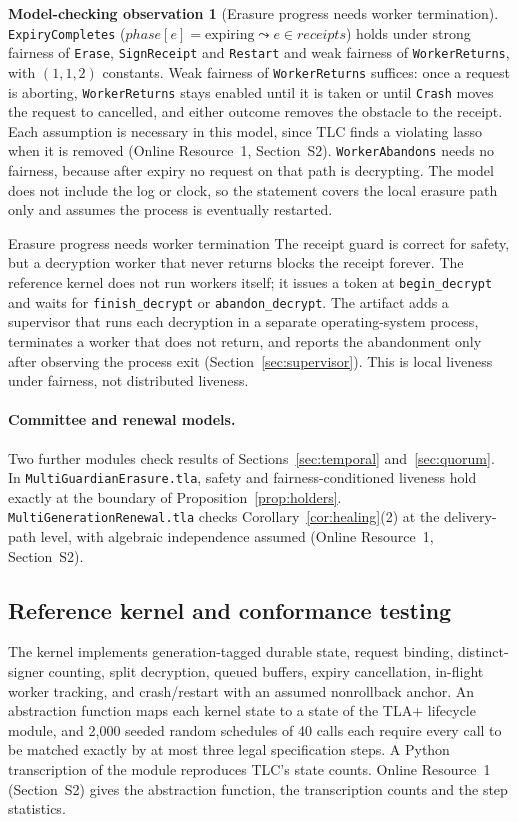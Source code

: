 \documentclass[pdflatex,sn-mathphys-num]{sn-jnl}%
\theoremstyle{plain}
\theoremstyle{definition}
\newtheorem{observation}{Model-checking observation}
\newcommand{\code}[1]{\texttt{#1}}
\begin{document}
\begin{observation}[Erasure progress needs worker termination]\label{obs:liveness}
\code{ExpiryCompletes} ($\mathit{phase}[e]=\text{expiring}\leadsto e\in\mathit{receipts}$) holds under strong fairness of \code{Erase}, \code{SignReceipt} and \code{Restart} and weak fairness of \code{WorkerReturns}, with $(1,1,2)$ constants. Weak fairness of \code{WorkerReturns} suffices: once a request is aborting, \code{WorkerReturns} stays enabled until it is taken or until \code{Crash} moves the request to cancelled, and either outcome removes the obstacle to the receipt. Each assumption is necessary in this model, since TLC finds a violating lasso when it is removed (Online Resource~1, Section~S2). \code{WorkerAbandons} needs no fairness, because after expiry no request on that path is decrypting. The model does not include the log or clock, so the statement covers the local erasure path only and assumes the process is eventually restarted.
\end{observation}

\begin{warnbox}{Erasure progress needs worker termination}
The receipt guard is correct for safety, but a decryption worker that never returns blocks the receipt forever. The reference kernel does not run workers itself; it issues a token at \code{begin\_decrypt} and waits for \code{finish\_decrypt} or \code{abandon\_decrypt}. The artifact adds a supervisor that runs each decryption in a separate operating-system process, terminates a worker that does not return, and reports the abandonment only after observing the process exit (Section~\ref{sec:supervisor}). This is local liveness under fairness, not distributed liveness.
\end{warnbox}

\paragraph{Committee and renewal models.}
Two further modules check results of Sections~\ref{sec:temporal} and~\ref{sec:quorum}. In \code{MultiGuardianErasure.tla}, safety and fairness-conditioned liveness hold exactly at the boundary of Proposition~\ref{prop:holders}. \code{MultiGenerationRenewal.tla} checks Corollary~\ref{cor:healing}(2) at the delivery-path level, with algebraic independence assumed (Online Resource~1, Section~S2).

\subsection{Reference kernel and conformance testing}
The kernel implements generation-tagged durable state, request binding, distinct-signer counting, split decryption, queued buffers, expiry cancellation, in-flight worker tracking, and crash/restart with an assumed nonrollback anchor. An abstraction function maps each kernel state to a state of the TLA+ lifecycle module, and 2,000 seeded random schedules of 40 calls each require every call to be matched exactly by at most three legal specification steps. A Python transcription of the module reproduces TLC's state counts. Online Resource~1 (Section~S2) gives the abstraction function, the transcription counts and the step statistics.
\end{document}
